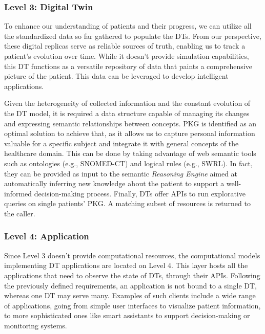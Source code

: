 \subsubsection{Level 3: Digital Twin}
To enhance our understanding of patients and their progress, we can utilize all the standardized data so far gathered to populate the DTs. From our perspective, these digital replicas serve as reliable sources of truth, enabling us to track a patient's evolution over time. While it doesn't provide simulation capabilities, this DT functions as a versatile repository of data that paints a comprehensive picture of the patient. This data can be leveraged to develop intelligent applications.

Given the heterogeneity of collected information and the constant evolution of the DT model, it is required a data structure capable of managing its changes and expressing semantic relationships between concepts. PKG is identified as an optimal solution to achieve that, as it allows us to capture personal information valuable for a specific subject and integrate it with general concepts of the healthcare domain. This can be done by taking advantage of web semantic tools such as ontologies (e.g., SNOMED-CT) and logical rules (e.g., SWRL). In fact, they can be provided as input to the semantic \textit{Reasoning Engine} aimed at automatically inferring new knowledge about the patient to support a well-informed decision-making process. 
Finally, DTs offer APIs to run explorative queries on single patients’ PKG. A matching subset of resources is returned to the caller.

\subsubsection{Level 4: Application}
Since Level 3 doesn't provide computational resources, the computational models implementing DT applications are located on Level 4. This layer hosts all the applications that need to observe the state of DTs, through their APIs. Following the previously defined requirements, an application is not bound to a single DT, whereas one DT may serve many. Examples of such clients include a wide range of applications, going from simple user interfaces to visualize patient information, to more sophisticated ones like smart assistants to support decision-making or monitoring systems.

